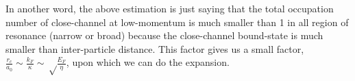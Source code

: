  



 In another word, the above estimation is just saying that the total occupation number of close-channel at low-momentum is much smaller than 1 in all region of resonance (narrow or broad) because the close-channel bound-state is much smaller than inter-particle distance.  This factor gives us a small factor, $\frac{r_{c}}{a_{0}}\sim\frac{k_{F}}{\kappa}\sim\sqrt\frac{E_{F}}{\eta}$, upon which we can do the expansion.  
